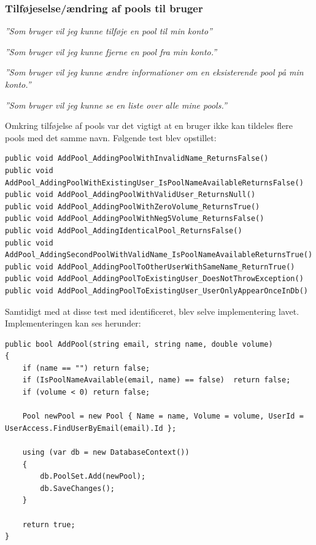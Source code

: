 \subsubsection{Tilføjeselse/ændring af pools til bruger}

\textit{''Som bruger vil jeg kunne tilføje en pool til min konto''}

\textit{''Som bruger vil jeg kunne fjerne en pool fra min konto.''}

\textit{''Som bruger vil jeg kunne ændre informationer om en eksisterende pool på min konto.''}

\textit{''Som bruger vil jeg kunne se en liste over alle mine pools.''}

Omkring tilføjelse af pools var det vigtigt at en bruger ikke kan tildeles flere pools med det samme navn. Følgende test blev opstillet:

\begin{lstlisting}[caption=Testcases til AddPool metoden]
public void AddPool_AddingPoolWithInvalidName_ReturnsFalse()
public void AddPool_AddingPoolWithExistingUser_IsPoolNameAvailableReturnsFalse()
public void AddPool_AddingPoolWithValidUser_ReturnsNull()
public void AddPool_AddingPoolWithZeroVolume_ReturnsTrue()
public void AddPool_AddingPoolWithNeg5Volume_ReturnsFalse()
public void AddPool_AddingIdenticalPool_ReturnsFalse()
public void AddPool_AddingSecondPoolWithValidName_IsPoolNameAvailableReturnsTrue()
public void AddPool_AddingPoolToOtherUserWithSameName_ReturnTrue()
public void AddPool_AddingPoolToExistingUser_DoesNotThrowException()
public void AddPool_AddingPoolToExistingUser_UserOnlyAppearOnceInDb()
\end{lstlisting}

Samtidigt med at disse test med identificeret, blev selve implementering lavet. Implementeringen kan ses herunder: 

\begin{lstlisting}[caption=AddPool metoden]
public bool AddPool(string email, string name, double volume)
{
	if (name == "")	return false;
	if (IsPoolNameAvailable(email, name) == false)	return false;
	if (volume < 0)	return false;
	
	Pool newPool = new Pool { Name = name, Volume = volume, UserId = UserAccess.FindUserByEmail(email).Id };
	
	using (var db = new DatabaseContext())
	{
		db.PoolSet.Add(newPool);
		db.SaveChanges();
	}
	
	return true;
}
\end{lstlisting}

